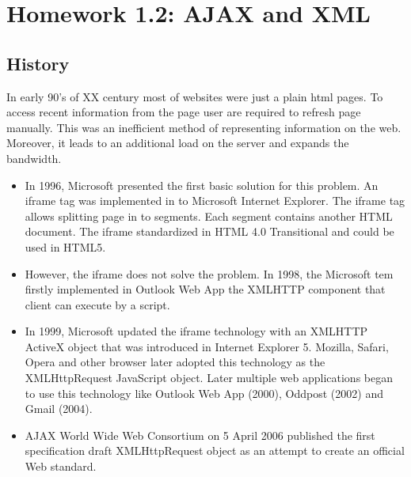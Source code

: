 
\section[Homework 1.2]{Homework 1.2: AJAX and XML}

\subsection{History}
In early 90’s of XX century most of websites were just a plain html pages. To access recent information from the page user are required to refresh page manually. This was an inefficient method of representing information on the web. Moreover, it leads to an additional load on the server and expands the bandwidth.
\begin{itemize}
\item In 1996, Microsoft presented the first basic solution for this problem. An iframe tag was implemented in to Microsoft Internet Explorer. The iframe tag allows splitting page in to segments. Each segment contains another HTML document. The iframe standardized in HTML 4.0 Transitional and could be used in HTML5.
\item However, the iframe does not solve the problem. In 1998, the Microsoft tem firstly implemented in Outlook Web App the XMLHTTP component that client can execute by a script. 
\item In 1999, Microsoft updated the iframe technology with an XMLHTTP ActiveX object that was introduced in Internet Explorer 5. Mozilla, Safari, Opera and other browser later adopted this technology as the XMLHttpRequest JavaScript object. Later multiple web applications began to use this technology like Outlook Web App (2000), Oddpost (2002) and Gmail (2004).
\\
\item AJAX World Wide Web Consortium on 5 April 2006 published the first specification draft XMLHttpRequest object as an attempt to create an official Web standard\cite {wk01}.
\end{itemize}


